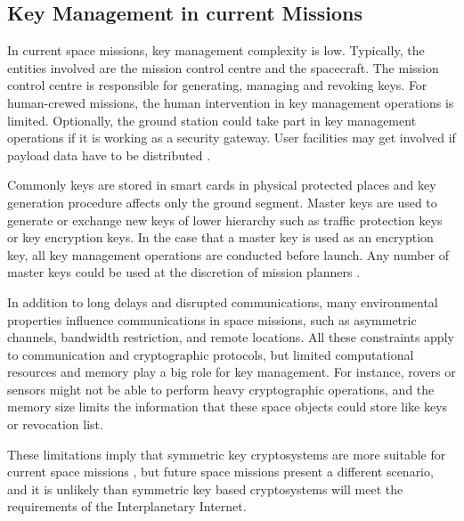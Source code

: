  
 



\subsection{Key Management in current Missions}

In current space missions, key management complexity is low. Typically, the entities involved are the mission control centre and the spacecraft. The mission control centre is responsible for generating, managing and revoking keys. For human-crewed missions, the human intervention in key management operations is limited. Optionally, the ground station could take part in key management operations if it is working as a security gateway. User facilities may get involved if payload data have to be distributed \cite{book2011space}. 


Commonly keys are stored in smart cards in physical protected places and key generation procedure affects only the ground segment. Master keys are used to generate or exchange new keys of lower hierarchy such as traffic protection keys or key encryption keys. In the case that a master key is used as an encryption key, all key management operations are conducted before launch. Any number of master keys could be used at the discretion of mission planners \cite{book2011space}.

In addition to long delays and disrupted communications, many environmental properties influence communications in space missions, such as asymmetric channels, bandwidth restriction, and remote locations. All these constraints apply to communication and cryptographic protocols, but limited computational resources and memory play a big role for key management. For instance, rovers or sensors might not be able to perform heavy cryptographic operations, and the memory size limits the information that these space objects could store like keys or revocation list.

These limitations imply that symmetric key cryptosystems are more suitable for current space missions \cite{book2011space}, but future space missions present a different scenario, and it is unlikely than symmetric key based cryptosystems will meet the requirements of the Interplanetary Internet.


